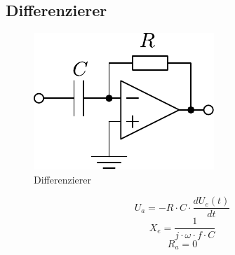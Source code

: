 



\subsection{Differenzierer}
\begin{figure}[h!]
	\centering
	\includegraphics[scale=\schscale]{../fig/op_diff.pdf}
	\caption{Differenzierer}
	\label{sch:op-diff}
\end{figure}
\[ U_a = - R \cdot C \cdot \frac{d U_e(t)}{dt} \]
\[ X_e = \frac{1}{j \cdot \omega \cdot f \cdot C} \]
\[ R_a = 0 \]